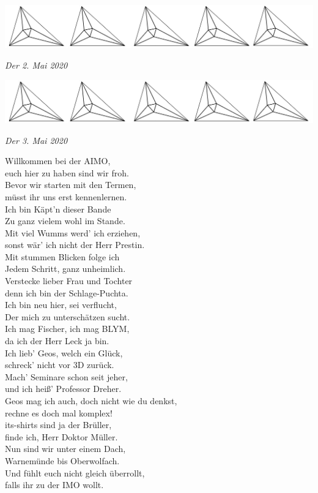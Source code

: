 \documentclass[oneside]{memoir}
\newcommand{\parasep}{
\bigskip
\bigskip
\begin{center} 
   \includegraphics[scale=.08]{parasep5.jpg} 
\end{center}
\bigskip
\bigskip
}
\begin{document}
\parasep
     \textit{Der 2. Mai 2020} \\ 
     
\parasep
     \textit{Der 3. Mai 2020} \\ 

\newpage
\thispagestyle{plain}
\begin{singlespace}
Willkommen bei der AIMO, \\
euch hier zu haben sind wir froh. \\
Bevor wir starten mit den Termen, \\
müsst ihr uns erst kennenlernen. \\

Ich bin Käpt'n dieser Bande \\
Zu ganz vielem wohl im Stande. \\
Mit viel Wumms werd' ich erziehen, \\
sonst wär' ich nicht der Herr Prestin. \\

Mit stummen Blicken folge ich \\
Jedem Schritt, ganz unheimlich. \\
Verstecke lieber Frau und Tochter \\
denn ich bin der Schlage-Puchta. \\

Ich bin neu hier, sei verflucht, \\
Der mich zu unterschätzen sucht. \\
Ich mag Fischer, ich mag BLYM, \\
 da ich der Herr Leck ja bin. \\

Ich lieb' Geos, welch ein Glück, \\
schreck' nicht vor 3D zurück. \\
Mach' Seminare schon seit jeher, \\
und ich heiß' Professor Dreher. \\

Geos mag ich auch, doch nicht wie du denkst, \\
rechne es doch mal komplex! \\
its-shirts sind ja der Brüller, \\
finde ich, Herr Doktor Müller. \\

Nun sind wir unter einem Dach, \\
Warnemünde bis Oberwolfach. \\
Und fühlt euch nicht gleich überrollt, \\
falls ihr zu der IMO wollt.
\end{singlespace}
\onehalfspacing
\end{document}
